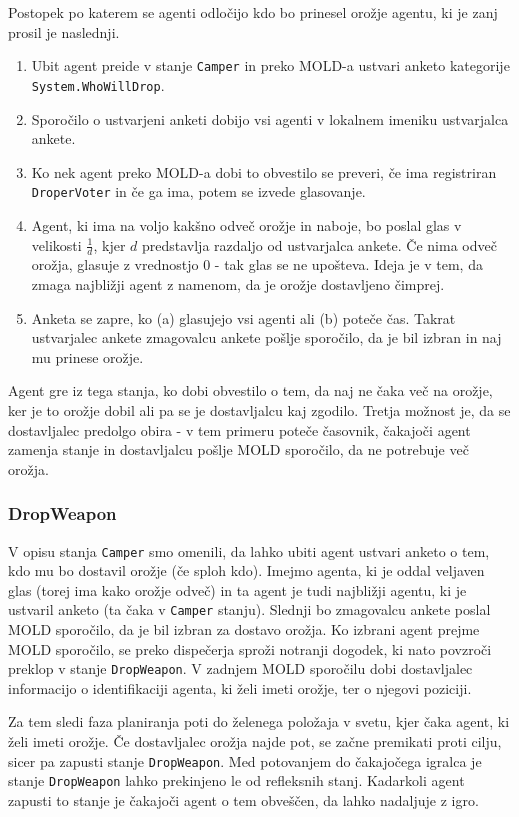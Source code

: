 \documentclass[a4paper,10pt]{article}
\begin{document}
Postopek po katerem se agenti odločijo kdo bo prinesel orožje agentu, ki je zanj prosil je naslednji.
\begin{enumerate}
 \item Ubit agent preide v stanje \verb+Camper+ in preko MOLD-a ustvari anketo kategorije \verb+System.WhoWillDrop+.
 \item Sporočilo o ustvarjeni anketi dobijo vsi agenti v lokalnem imeniku ustvarjalca ankete.
 \item Ko nek agent preko MOLD-a dobi to obvestilo se preveri, če ima registriran \verb+DroperVoter+ in če
       ga ima, potem se izvede glasovanje. 
 \item Agent, ki ima na voljo kakšno odveč orožje in naboje, bo poslal glas v velikosti $\frac{1}{d}$, kjer $d$ predstavlja razdaljo od ustvarjalca ankete. 
       Če nima odveč orožja, glasuje z vrednostjo 0 - tak glas se ne upošteva. Ideja je v tem, da zmaga najbližji agent z namenom, da je orožje 
       dostavljeno čimprej.
 \item Anketa se zapre, ko (a) glasujejo vsi agenti ali (b) poteče čas. Takrat ustvarjalec ankete zmagovalcu ankete pošlje sporočilo, da je bil izbran in naj 
       mu prinese orožje.
\end{enumerate}
Agent gre iz tega stanja, ko dobi obvestilo o tem, da naj ne čaka več na orožje, ker je to orožje dobil ali pa se je dostavljalcu kaj zgodilo. Tretja možnost je, da se dostavljalec predolgo obira - v tem primeru poteče časovnik, čakajoči agent zamenja stanje in dostavljalcu pošlje MOLD sporočilo, da ne potrebuje več orožja.
\subsubsection{DropWeapon} \label{sec:states-dropweapon}
V opisu stanja \verb+Camper+ smo omenili, da lahko ubiti agent ustvari anketo o tem, kdo mu bo dostavil orožje (če sploh kdo). Imejmo agenta, ki je oddal veljaven glas (torej ima kako orožje odveč) in ta agent je tudi najbližji agentu, ki je ustvaril anketo (ta čaka v \verb+Camper+ stanju). Slednji bo zmagovalcu ankete poslal MOLD sporočilo, da je bil izbran za dostavo orožja. Ko izbrani agent prejme MOLD sporočilo, se preko dispečerja sproži notranji dogodek, ki nato povzroči preklop v stanje \verb+DropWeapon+. V zadnjem MOLD sporočilu dobi dostavljalec informacijo o identifikaciji agenta, ki želi imeti orožje, ter o njegovi poziciji.

Za tem sledi faza planiranja poti do želenega položaja v svetu, kjer čaka agent, ki želi imeti orožje. Če dostavljalec orožja najde pot, se začne premikati proti cilju, sicer pa zapusti stanje \verb+DropWeapon+. Med potovanjem do čakajočega igralca je stanje \verb+DropWeapon+ lahko prekinjeno le od refleksnih stanj. Kadarkoli agent zapusti to stanje je čakajoči agent o tem obveščen, da lahko nadaljuje z igro.
\end{document}
